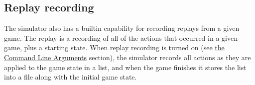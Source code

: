 \subsection{Replay recording}

The simulator also has a builtin capability for recording replays from a given game. The replay is a recording of all of the actions that occurred in a given game, plus a starting state. When replay recording is turned on (see \hyperref[cmd-args]{the Command Line Arguments} section), the simulator records all actions as they are applied to the game state in a list, and when the game finishes it stores the list into a file along with the initial game state.

